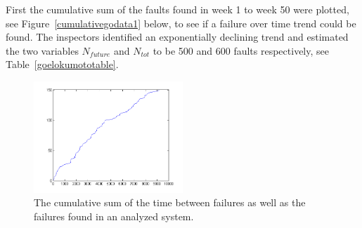First the cumulative sum of the faults found in week 1 to week 50 were plotted, see Figure~\ref{cumulativegodata1} below, to see if a failure over time trend could be found.
The inspectors identified an exponentially declining trend and estimated the two variables $N_{future}$ and $N_{tot}$ to be 500 and 600 faults respectively, see Table~\ref{goelokumototable}. 


\begin{figure}[htb!]
\begin{center}
	\includegraphics[width=0.5\textwidth]{cumsumjmdata1plot.png}
\caption{The cumulative sum of the time between failures as well as the failures found in an analyzed system.}
\end{center}
\label{cumulativejmdata1}
\end{figure}